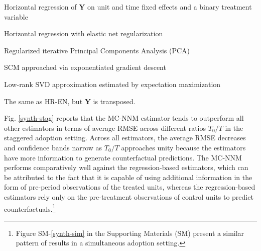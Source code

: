 \documentclass[12pt]{article}
\begin{document}
\begin{description}
	{\setlength\itemindent{1mm}
		\item[DID] Horizontal regression of $\mathbf{Y}$ on unit and time fixed effects and a binary treatment variable \citep{athey2017matrix}
		\item[HR-EN] Horizontal regression with elastic net regularization \citep{athey2017matrix} 
		\item[PCA] Regularized iterative Principal Components Analysis (PCA) \citep{ilin2010practical,josse2012handling}
		\item[SC-ADH] SCM approached via exponentiated gradient descent \citep{abadie2010synthetic}
		\item[SVD] Low-rank SVD approximation estimated by expectation maximization \citep{troyanskaya2001missing}
		\item[VT-EN] The same as HR-EN, but $\mathbf{Y}$ is transposed.
	}
\end{description}
%
Fig. \ref{synth-stag} reports that the MC-NNM estimator tends to outperform all other estimators in terms of average RMSE across different ratios $T_0/T$ in the staggered adoption setting. Across all estimators, the average RMSE decreases and confidence bands narrow as $T_0/T$ approaches unity because the estimators have more information to generate counterfactual predictions. The MC-NNM performs comparatively well against the regression-based estimators, which can be attributed to the fact that it is capable of using additional information in the form of pre-period observations of the treated units, whereas the regression-based estimators rely only on the pre-treatment observations of control units to predict counterfactuals.\footnote{Figure SM-\ref{synth-sim} in the Supporting Materials (SM) present a similar pattern of results in a simultaneous adoption setting.}
\end{document}
